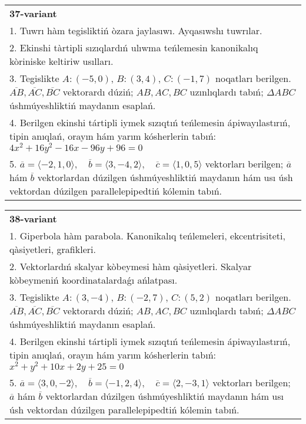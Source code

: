 \documentclass{article}
\begin{document}
\begin{tabular}{m{17cm}}
\textbf{37-variant}\\
1. Tuwrı hàm tegisliktiń òzara jaylasıwı. Ayqasıwshı tuwrılar.\\

2. Ekinshi tàrtipli sızıqlardıń ulıwma teńlemesin kanonikalıq kòriniske keltiriw usılları.\\

3. Tegislikte $A: (-5, 0)$, $B: (3, 4)$, $C: (-1, 7)$ noqatları berilgen. $\overline{AB}, \overline{AC}, \overline{BC}$ vektorardı dúziń; $AB, AC, BC$ uzınlıqlardı tabıń; $\Delta ABC$ úshmúyeshliktiń maydanın esaplań. \\

4. Berilgen ekinshi tártipli iymek sızıqtıń teńlemesin ápiwayılastırıń, tipin anıqlań, orayın hám yarım kósherlerin tabıń: $4x^2+16y^2-16x-96y+96=0$\\

5. \(\overline{a} = \langle -2, 1, 0 \rangle, \quad \overline{b} = \langle 3, -4, 2 \rangle, \quad \overline{c} = \langle 1, 0, 5 \rangle\) vektorları berilgen; \(\overline{a}\) hám \(\overline{b}\) vektorlardan dúzilgen úshmúyeshliktiń maydanın hám usı úsh vektordan dúzilgen parallelepipedtiń kólemin tabıń.
\end{tabular}
\vspace{1cm}


\begin{tabular}{m{17cm}}
\textbf{38-variant}\\
1. Giperbola hàm parabola. Kanonikalıq teńlemeleri, ekcentrisiteti, qàsiyetleri, grafikleri.\\

2. Vektorlardıń skalyar kòbeymesi hàm qàsiyetleri. Skalyar kòbeymeniń koordinatalardaǵı ańlatpası.\\

3. Tegislikte $A: (3, -4)$, $B: (-2, 7)$, $C: (5, 2)$ noqatları berilgen. $\overline{AB}, \overline{AC}, \overline{BC}$ vektorardı dúziń; $AB, AC, BC$ uzınlıqlardı tabıń; $\Delta ABC$ úshmúyeshliktiń maydanın esaplań. \\

4. Berilgen ekinshi tártipli iymek sızıqtıń teńlemesin ápiwayılastırıń, tipin anıqlań, orayın hám yarım kósherlerin tabıń: $x^2+y^2+10x+2y+25=0$\\

5. \(\overline{a} = \langle 3, 0, -2 \rangle, \quad \overline{b} = \langle -1, 2, 4 \rangle, \quad \overline{c} = \langle 2, -3, 1 \rangle\) vektorları berilgen; \(\overline{a}\) hám \(\overline{b}\) vektorlardan dúzilgen úshmúyeshliktiń maydanın hám usı úsh vektordan dúzilgen parallelepipedtiń kólemin tabıń.
\end{tabular}
\vspace{1cm}
\end{document}
